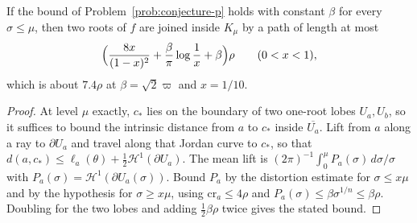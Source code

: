 \documentclass[11pt]{article}
\begin{document}
\begin{theorem}
\label{res:conjecture-p-consumer}
If the bound of Problem~\ref{prob:conjecture-p} holds with constant $\beta$
for every $\sigma\le\mu$, then two roots of $f$ are joined inside $K_\mu$
by a path of length at most
\[
 \Bigl(\frac{8x}{(1-x)^2}+\frac\beta\pi\log\frac1x+\beta\Bigr)\rho
 \qquad(0<x<1),
\]
which is about $7.4\rho$ at $\beta=\sqrt2\varpi$ and $x=1/10$.
\end{theorem}

\begin{proof}
At level $\mu$ exactly, $c_*$ lies on the boundary of two one-root lobes
$U_a,U_b$, so it suffices to bound the intrinsic distance from $a$ to $c_*$
inside $\overline{U_a}$.  Lift from $a$ along a ray to $\partial U_a$ and
travel along that Jordan curve to $c_*$, so that
$d(a,c_*)\le\ell_a(\theta)+\tfrac12\mathcal H^1(\partial U_a)$.  The mean lift
is $(2\pi)^{-1}\int_0^\mu P_a(\sigma)\,d\sigma/\sigma$ with
$P_a(\sigma)=\mathcal H^1(\partial U_a(\sigma))$.  Bound $P_a$ by the
distortion estimate for $\sigma\le x\mu$ and by the hypothesis for
$\sigma\ge x\mu$, using $\mathrm{cr}_a\le4\rho$ and
$P_a(\sigma)\le\beta\sigma^{1/n}\le\beta\rho$.  Doubling for the two lobes and
adding $\tfrac12\beta\rho$ twice gives the stated bound.
\end{proof}
\end{document}
